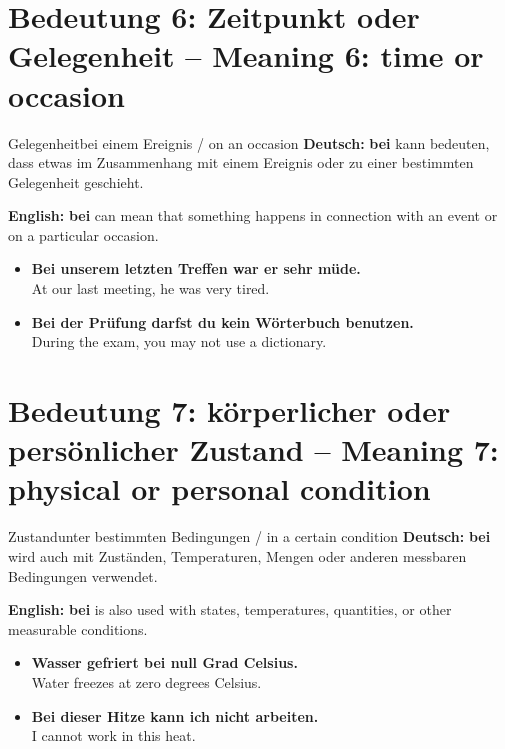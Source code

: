 \documentclass[a4paper,11pt]{article}
\newcommand{\GermanText}[1]{\textbf{Deutsch: }#1\par}
\newcommand{\EnglishText}[1]{{\small\color{SoftGray}\textbf{English: }#1\par}}
\newcommand{\ExampleItem}[2]{\item \textbf{#1}\\{\small\color{SoftGray}#2}}
\begin{document}
   \section{Bedeutung 6: Zeitpunkt oder Gelegenheit -- Meaning 6: time or occasion}
                        \begin{grammarentry}{Gelegenheit}{bei einem Ereignis / on an occasion}
                           \GermanText{\textbf{bei} kann bedeuten, dass etwas im Zusammenhang mit einem Ereignis oder zu einer bestimmten Gelegenheit geschieht.}
                           \EnglishText{\textbf{bei} can mean that something happens in connection with an event or on a particular occasion.}
                        \end{grammarentry}
                        \begin{exbox}\begin{itemize}
                           \ExampleItem{Bei unserem letzten Treffen war er sehr müde.}{At our last meeting, he was very tired.}
                           \ExampleItem{Bei der Prüfung darfst du kein Wörterbuch benutzen.}{During the exam, you may not use a dictionary.}
                           \end{itemize}\end{exbox}

   \section{Bedeutung 7: körperlicher oder persönlicher Zustand -- Meaning 7: physical or personal condition}
                           \begin{grammarentry}{Zustand}{unter bestimmten Bedingungen / in a certain condition}
                              \GermanText{\textbf{bei} wird auch mit Zuständen, Temperaturen, Mengen oder anderen messbaren Bedingungen verwendet.}
                              \EnglishText{\textbf{bei} is also used with states, temperatures, quantities, or other measurable conditions.}
                           \end{grammarentry}
                           \begin{exbox}\begin{itemize}
                              \ExampleItem{Wasser gefriert bei null Grad Celsius.}{Water freezes at zero degrees Celsius.}
                              \ExampleItem{Bei dieser Hitze kann ich nicht arbeiten.}{I cannot work in this heat.}
                              \end{itemize}\end{exbox}
\end{document}
